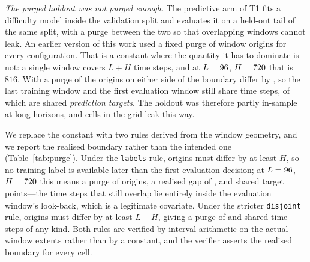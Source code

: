 \documentclass[a4paper,fleqn]{cas-sc}
\newcommand{\fitwidth}[1]{%
  \resizebox{\ifdim\width>\linewidth \linewidth\else \width\fi}{!}{#1}}
\begin{document}
\begin{table}[t]
\centering
\caption{The intact difficulty association under three inference schemes, over
\NumDepCells{} runs. The independent-pairs approximation, which an earlier version
of this work used, over-states significance roughly threefold relative to
dependence-aware alternatives; cluster resampling over
\NumDepSampleSetsVal{} sample sets or \NumDepDatasets{} datasets widens every
interval substantially. Generated by
\texttt{tools/make\_downstream\_revision.py}; sources
\texttt{artifacts/t1\_difficulty\_depaware.csv} and
\texttt{artifacts/t1\_cluster\_summary.csv}.}
\label{tab:depaware}
\fitwidth{}
\end{table}

\emph{The purged holdout was not purged enough.} The predictive arm of T1 fits a
difficulty model inside the validation split and evaluates it on a held-out tail of
the same split, with a purge between the two so that overlapping windows cannot
leak. An earlier version of this work used a fixed purge of
\NumPurgeLegacyOrigins{} window origins for every configuration. That is a constant
where the quantity it has to dominate is not: a single window covers $L+H$ time
steps, and at $L = 96{}$, $H = 720{}$ that is
$816$. With a purge of \NumPurgeLegacyOrigins{} the origins on either side of the
boundary differ by \NumPurgeLegacyGap{}, so the last training window and the first
evaluation window still share \NumPurgeLegacySharedTime{} time steps, of which
\NumPurgeLegacySharedTarget{} are shared \emph{prediction targets}. The holdout was
therefore partly in-sample at long horizons, and \NumPurgeLegacyLeakCells{} cells
in the grid leak this way.

We replace the constant with two rules derived from the window geometry, and we
report the realised boundary rather than the intended one
(Table~\ref{tab:purge}). Under the \texttt{labels} rule, origins must differ by at
least $H$, so no training label is available later than the first evaluation
decision; at $L = 96{}$, $H = 720{}$ this
means a purge of \NumPurgeLabelsOrigins{} origins, a realised gap of
\NumPurgeLabelsGap{}, and \NumPurgeLabelsSharedTarget{} shared target points---the
\NumPurgeLabelsSharedTime{} time steps that still overlap lie entirely inside the
evaluation window's look-back, which is a legitimate covariate. Under the stricter
\texttt{disjoint} rule, origins must differ by at least $L+H$, giving a purge of
\NumPurgeDisjointOrigins{} and \NumPurgeDisjointSharedTime{} shared time steps of
any kind. Both rules are verified by interval arithmetic on the actual window
extents rather than by a constant, and the verifier asserts the realised boundary
for every cell.
\end{document}
